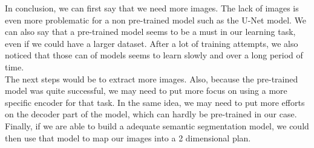 In conclusion, we can first say that we need more images. The lack of images is even more problematic for a non pre-trained model such as the U-Net model. We can also say that a pre-trained model seems to be a must in our learning task, even if we could have a larger dataset. After a lot of training attempts, we also noticed that those can of models seems to learn slowly and over a long period of time. \\
The next steps would be to extract more images. Also, because the pre-trained model was quite successful, we may need to put more focus on using a more specific encoder for that task. In the same idea, we may need to put more efforts on the decoder part of the model, which can hardly be pre-trained in our case. Finally, if we are able to build a adequate semantic segmentation model, we could then use that model to map our images into a 2 dimensional plan.